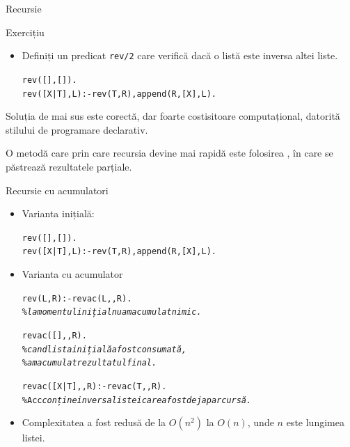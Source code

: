\documentclass[xcolor=x11names,compress,10pt]{beamer}
\begin{document}
\begin{frame}{Recursie}
\vspace*{0.3cm}

\begin{block}{Exercițiu}
\begin{itemize}

\item Definiți un predicat \texttt{rev/2} care verifică dacă o listă este inversa altei liste. 
\medskip\pause
\begin{alltt}
rev([],[]).\\
rev([X|T],L) :- rev(T,R),append(R,[X],L).
\end{alltt}
\end{itemize}
\end{block}

Soluția de mai sus este corectă, dar foarte costisitoare computațional, datorită stilului de programare declarativ. 
\medskip



\medskip

O metodă care prin care recursia devine mai rapidă este folosirea , în care se păstrează rezultatele parțiale.
 
\end{frame}

\begin{frame}{Recursie cu acumulatori}
\begin{itemize}
\item Varianta inițială:
\begin{alltt}
rev([],[]).\\
rev([X|T],L) :- rev(T,R),append(R,[X],L). 
\end{alltt}
\item Varianta cu acumulator
\begin{alltt}
rev(L,R) :- revac(L,\intens{[]},R).\\
\% {\em la momentul inițial nu am acumulat nimic.  }    
\medskip\pause

revac([], , R).\\
\% {\em cand lista inițială a fost consumată,}\\
\% {\em am acumulat rezultatul final.}
\medskip\pause

revac([X|T], , R) :- revac(T,\intens{[X|Acc]},R).\\
\% \texttt{Acc} {\em conține inversa listei care a fost deja parcursă.} 
\end{alltt}
\item Complexitatea a fost redusă de la $O(n^2)$ la $O(n)$, unde $n$ este lungimea listei.
\end{itemize}
\end{frame}
\end{document}
